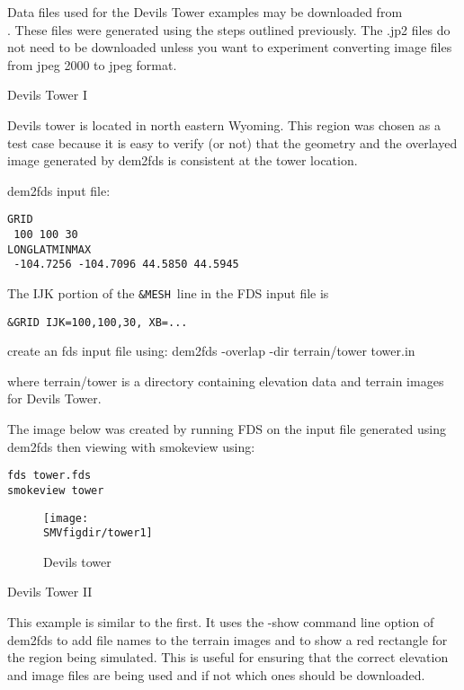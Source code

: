 
Data files used for the Devils Tower examples may be downloaded from \\
.
These files were generated using the steps outlined previously.
The .jp2 files do not need to be downloaded unless you want to experiment converting image files from jpeg 2000 to jpeg format.

Devils Tower I

Devils tower is located in north eastern Wyoming.
This region was chosen as a test case because it is easy to verify (or not) that the geometry and the
overlayed image generated by dem2fds is consistent at the tower location.

dem2fds input file:
\begin{verbatim}
GRID
 100 100 30
LONGLATMINMAX
 -104.7256 -104.7096 44.5850 44.5945
\end{verbatim}

The IJK portion of the {\tt \&MESH}\ line in the FDS input file is

\begin{verbatim}
&GRID IJK=100,100,30, XB=...
\end{verbatim}

create an fds input file using:
dem2fds -overlap -dir terrain/tower tower.in

where terrain/tower is a directory containing elevation data and terrain images for Devils Tower.

The image below was created by running FDS on the input file generated using dem2fds then viewing with smokeview using:

\begin{verbatim}
fds tower.fds
smokeview tower
\end{verbatim}

\begin{figure}[bph]
\centerline{
\texttt{[image: \\SMVfigdir/tower1]}}
 \caption[FDS file overview]{Devils tower }
\label{devilstower}%
\end{figure}


Devils Tower II

This example is similar to the first. It uses the -show command line option of dem2fds to add file names
to the terrain images and to show a red rectangle for the region being simulated.
This is useful for ensuring that the correct elevation and image files are being used and if not which ones should be downloaded.

